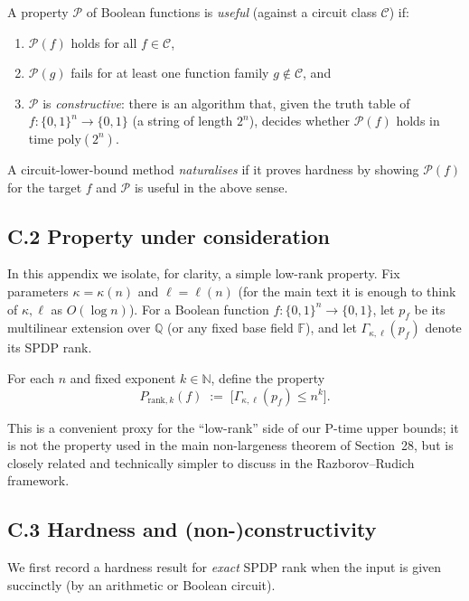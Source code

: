 \documentclass[12pt]{article}
\theoremstyle{definition}
\theoremstyle{definition}
\theoremstyle{remark}
\theoremstyle{remark}
\begin{document}
A property $\mathcal{P}$ of Boolean functions is \emph{useful} (against a circuit class
$\mathcal{C}$) if:

\begin{enumerate}
\item $\mathcal{P}(f)$ holds for all $f \in \mathcal{C}$,
\item $\mathcal{P}(g)$ fails for at least one function family $g \notin \mathcal{C}$, and
\item $\mathcal{P}$ is \emph{constructive}: there is an algorithm that, given the truth table
of $f : \{0,1\}^n \to \{0,1\}$ (a string of length $2^n$), decides whether $\mathcal{P}(f)$
holds in time $\mathrm{poly}(2^n)$.
\end{enumerate}

A circuit-lower-bound method \emph{naturalises} if it proves hardness by showing
$\mathcal{P}(f)$ for the target $f$ and $\mathcal{P}$ is useful in the above sense.

\subsection*{C.2 Property under consideration}

In this appendix we isolate, for clarity, a simple low-rank property. Fix parameters
$\kappa = \kappa(n)$ and $\ell = \ell(n)$ (for the main text it is enough to think of $\kappa,\ell$ as
$O(\log n)$). For a Boolean function $f : \{0,1\}^n \to \{0,1\}$, let $p_f$ be its multilinear
extension over $\mathbb{Q}$ (or any fixed base field $\mathbb{F}$), and let
$\Gamma_{\kappa,\ell}(p_f)$ denote its SPDP rank.

For each $n$ and fixed exponent $k \in \mathbb{N}$, define the property
\[
  P_{\mathrm{rank},k}(f)
  \;:=\;
  \bigl[
    \Gamma_{\kappa,\ell}(p_f) \le n^{k}
  \bigr].
\]

This is a convenient proxy for the ``low-rank'' side of our P-time upper bounds; it is
not the property used in the main non-largeness theorem of Section~28, but is closely
related and technically simpler to discuss in the Razborov--Rudich framework.

\subsection*{C.3 Hardness and (non-)constructivity}

We first record a hardness result for \emph{exact} SPDP rank when the input is given
succinctly (by an arithmetic or Boolean circuit).
\end{document}
